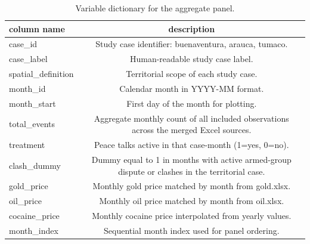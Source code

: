 \begin{table}[ht]
\centering
\caption{Variable dictionary for the aggregate panel.}
\label{tab:variable_dictionary}
\begin{tabular}{l c}
\hline
column name & description \\
\hline
case\_id & Study case identifier: buenaventura, arauca, tumaco. \\
case\_label & Human-readable study case label. \\
spatial\_definition & Territorial scope of each study case. \\
month\_id & Calendar month in YYYY-MM format. \\
month\_start & First day of the month for plotting. \\
total\_events & Aggregate monthly count of all included observations across the merged Excel sources. \\
treatment & Peace talks active in that case-month (1=yes, 0=no). \\
clash\_dummy & Dummy equal to 1 in months with active armed-group dispute or clashes in the territorial case. \\
gold\_price & Monthly gold price matched by month from gold.xlsx. \\
oil\_price & Monthly oil price matched by month from oil.xlsx. \\
cocaine\_price & Monthly cocaine price interpolated from yearly values. \\
month\_index & Sequential month index used for panel ordering. \\
\hline
\end{tabular}
\end{table}
